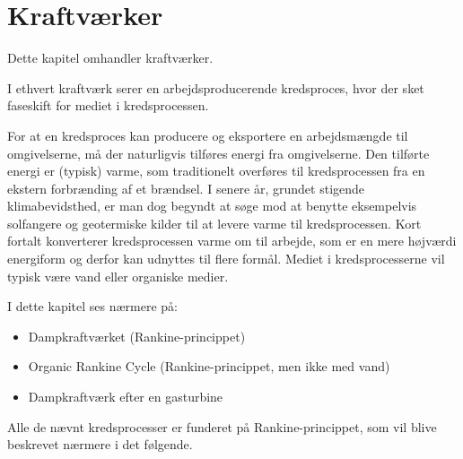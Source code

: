 
\section{Kraftværker} \label{afs:kraftværk}
Dette kapitel omhandler kraftværker.
\begin{definition}[Kraftværk]
  I ethvert kraftværk serer en arbejdsproducerende kredsproces, hvor der sket faseskift for mediet i kredsprocessen.
\end{definition}

For at en kredsproces kan producere og eksportere en arbejdsmængde til omgivelserne, må der naturligvis tilføres energi fra omgivelserne. Den tilførte energi er (typisk) varme, som traditionelt overføres til kredsprocessen fra en ekstern forbrænding af et brændsel. I senere år, grundet stigende klimabevidsthed, er man dog begyndt at søge mod at benytte eksempelvis solfangere og geotermiske kilder til at levere varme til kredsprocessen. Kort fortalt konverterer kredsprocessen varme om til arbejde, som er en mere højværdi energiform og derfor kan udnyttes til flere formål. Mediet i kredsprocesserne vil typisk være vand eller organiske medier.

I dette kapitel ses nærmere på:
\begin{itemize}
  \item Dampkraftværket (Rankine-princippet)
  \item Organic Rankine Cycle (Rankine-princippet, men ikke med vand)
  \item Dampkraftværk efter en gasturbine
\end{itemize}
Alle de nævnt kredsprocesser er funderet på Rankine-princippet, som vil blive beskrevet nærmere i det følgende. 

